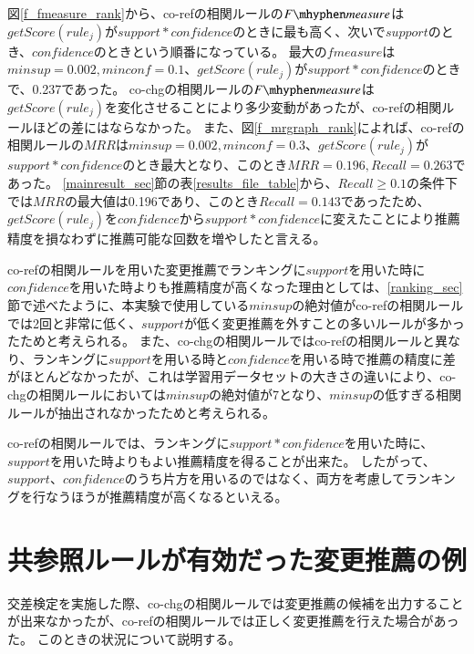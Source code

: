 \documentclass[a4paper]{jsbook}
\newcommand{\minconf}{mincon\!f}
\newcommand{\confidence}{con\!f\!idence}
\newcommand{\fmeasure}{F\mhyphen measure}
\newcommand{\getScore}{getS\!core}
\begin{document}
図\ref{f_fmeasure_rank}から、co-refの相関ルールの$\fmeasure$は$\getScore(rule_j)$が$support*\confidence$のときに最も高く、次いで$support$のとき、$\confidence$のときという順番になっている。
最大の$fmeasure$は$minsup=0.002,\minconf=0.1$、$\getScore(rule_j)$が$support*\confidence$のときで、0.237であった。
co-chgの相関ルールの$\fmeasure$は$\getScore(rule_j)$を変化させることにより多少変動があったが、co-refの相関ルールほどの差にはならなかった。
また、図\ref{f_mrgraph_rank}によれば、co-refの相関ルールの$MRR$は$minsup=0.002,\minconf=0.3$、$\getScore(rule_j)$が$support*\confidence$のとき最大となり、このとき$MRR=0.196,Recall=0.263$であった。
\ref{mainresult_sec}節の表\ref{results_file_table}から、$Recall\geq 0.1$の条件下では$MRR$の最大値は0.196であり、このとき$Recall=0.143$であったため、$\getScore(rule_j)$を$\confidence$から$support*\confidence$に変えたことにより推薦精度を損なわずに推薦可能な回数を増やしたと言える。

co-refの相関ルールを用いた変更推薦でランキングに$support$を用いた時に$\confidence$を用いた時よりも推薦精度が高くなった理由としては、\ref{ranking_sec}節で述べたように、本実験で使用している$minsup$の絶対値がco-refの相関ルールでは2回と非常に低く、$support$が低く変更推薦を外すことの多いルールが多かったためと考えられる。
また、co-chgの相関ルールではco-refの相関ルールと異なり、ランキングに$support$を用いる時と$\confidence$を用いる時で推薦の精度に差がほとんどなかったが、これは学習用データセットの大きさの違いにより、co-chgの相関ルールにおいては$minsup$の絶対値が7となり、$minsup$の低すぎる相関ルールが抽出されなかったためと考えられる。

co-refの相関ルールでは、ランキングに$support*\confidence$を用いた時に、$support$を用いた時よりもよい推薦精度を得ることが出来た。
したがって、$support$、$\confidence$のうち片方を用いるのではなく、両方を考慮してランキングを行なうほうが推薦精度が高くなるといえる。

\section{共参照ルールが有効だった変更推薦の例}
交差検定を実施した際、co-chgの相関ルールでは変更推薦の候補を出力することが出来なかったが、co-refの相関ルールでは正しく変更推薦を行えた場合があった。
このときの状況について説明する。
\end{document}
